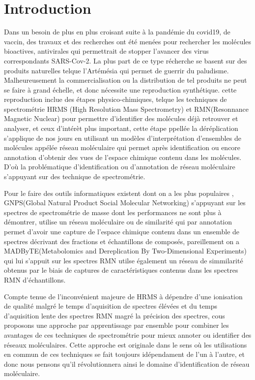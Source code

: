 \documentclass[letterpaper,twocolumn,10pt]{article}
\begin{document}
\section{Introduction}
    Dans un besoin de plus en plus croisant suite à la pandémie du covid19, de vaccin, des travaux et des recherches ont été menées pour rechercher les molécules bioactives, antivirales qui permettrait de stopper l’avancer des virus correspondants SARS-Cov-2. La plus part de ce type récherche se basent sur des produits naturelles telque l'Artémésia qui permet de guerrir du paludisme. Malheureusement la commercialisation ou la distribution de tel produits ne peut se faire à grand échelle, et donc nécessite une reproduction synthétique. cette reproduction inclue des étapes physico-chimiques, telque les techniques de spectrométrie HRMS (High Resolution Mass Spectrometry) et RMN(Resonnance Magnetic Nuclear) pour permettre d'identifier des molécules déjà retrouver et analyser, et ceux d'intérèt plus important, cette étape ppellée la déréplication s'applique de nos jours en utilisant un modèles d'interprétation d'ensembles de molécules appélée réseau moléculaire qui permet après identification ou encore annotation d'obtenir des vues de l'espace chimique contenu dans les molécules. D'où la problématique d'identification ou d'annotation de réseau moléculaire s'appuyant sur des technique de spectrométrie. 
    
    Pour le faire des outils informatiques existent dont on a les plus populaires , GNPS(Global Natural Product Social Molecular Networking) s'appuyant sur les spectres de spectrométrie de masse dont les performances ne sont plus à démontrer, utilise un réseau moléculaire ou de similarité qui par annotation permet d'avoir une capture de l'espace chimique contenu dans un ensemble de spectres décrivant des fractions et échantillons de composés, pareillement on a MADByTE(Metabolomics and Dereplication By Two-Dimensional Experiments) qui lui s'appuit sur les spectres RMN utilse également un réseau de simmilarité obtenus par le biais de captures de caractéristiques contenus dans les spectres RMN d'échantillons.

    Compte tenue de l'inconvénient majeure de HRMS à dépendre d'une ionisation de qualité malgré le temps d'aquisition de spectres élévées et du temps d'aquisition lente des spectres RMN magré la précision des spectres, cous proposons une approche par apprentissage par ensemble pour combiner les avantages de ces techniques de spectrométrie pour mieux annoter ou identifier des réseaux moléculaires. Cette approche est originale dans le sens où les utilisations en commun de ces techniques se fait toujours idépendament de l'un à l'autre, et donc nous pensons qu'il révolutionnera ainsi le domaine d'identification de réseau moléculaire.
\end{document}

